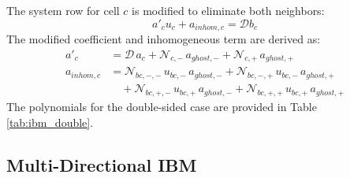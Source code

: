 \documentclass[preprint,12pt]{elsarticle}
\begin{document}
The system row for cell $c$ is modified to eliminate both neighbors:
\begin{equation}
    a'_c u_c + a_{inhom,c} = \mathcal{D} b_c
\end{equation}
The modified coefficient and inhomogeneous term are derived as:
\begin{align}
    a'_c &= \mathcal{D} \, a_c +  \mathcal{N}_{c,-} \, a_{ghost,-} + \mathcal{N}_{c,+} \, a_{ghost,+} \\
    a_{inhom,c} &= \mathcal{N}_{bc,-,-}  \, u_{bc,-} \,  a_{ghost,-} + \mathcal{N}_{bc,-,+}  \, u_{bc,-} \, a_{ghost,+} \nonumber \\
    & \quad
        + \mathcal{N}_{bc,+,-}  \, u_{bc,+} \, a_{ghost,-}
     + \mathcal{N}_{bc,+,+}  \, u_{bc,+} \,  a_{ghost,+}
\end{align}
The polynomials for the double-sided case are provided in Table \ref{tab:ibm_double}. 

\begin{table}[h!]
    \centering
    \renewcommand{\arraystretch}{2.0}
    \caption{Geometric polynomials for the double-sided (sandwiched) case. The cases for $- \leftrightarrow +$ can be obtained by interchanging $\xi_- \leftrightarrow \xi_+$.}
    \label{tab:ibm_double}
\end{table}

\subsection{Multi-Directional IBM}
\end{document}
